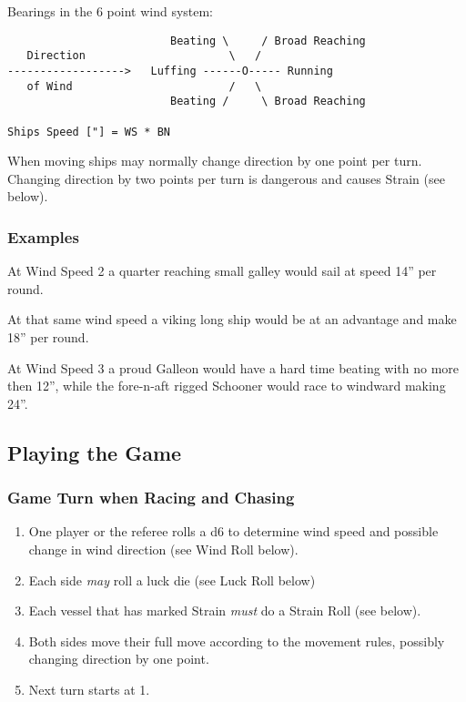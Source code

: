 \documentclass[11pt]{wbzine}
\begin{document}
Bearings in the 6 point wind system:

\begin{verbatim}
                         Beating \     / Broad Reaching
   Direction                      \   /
------------------>   Luffing ------O----- Running
   of Wind                        /   \
                         Beating /     \ Broad Reaching

Ships Speed ["] = WS * BN

\end{verbatim}


When moving ships may normally change direction by one point per turn.
Changing direction by two points per turn is dangerous and causes Strain
(see below).

\begin{multicols}{2}

\subsubsection{Examples}

At Wind Speed 2 a quarter reaching small galley would sail at speed 14''
per round.

At that same wind speed a viking long ship would be at an advantage and
make 18'' per round.

At Wind Speed 3 a proud Galleon would have a hard time beating with no
more then 12'', while the fore-n-aft rigged Schooner would race to
windward making 24''.

\subsection{Playing the Game}

\subsubsection{Game Turn when Racing and
Chasing}

\begin{enumerate}
\item
  One player or the referee rolls a d6 to determine wind speed and
  possible change in wind direction (see Wind Roll below).
\item
  Each side \emph{may} roll a luck die (see Luck Roll below)
\item
  Each vessel that has marked Strain \emph{must} do a Strain Roll (see
  below).
\item
  Both sides move their full move according to the movement rules,
  possibly changing direction by one point.
\item
  Next turn starts at 1.
\end{enumerate}


\end{multicols}
\end{document}
